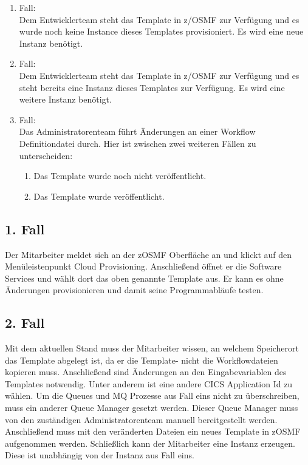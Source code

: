 \begin{samepage}
\begin{enumerate}
\item Fall:\\
Dem Entwicklerteam steht das Template in z/OSMF zur Verfügung und es wurde noch keine Instance dieses Templates provisioniert.
Es wird eine neue Instanz benötigt.
\item Fall:\\
Dem Entwicklerteam steht das Template in z/OSMF zur Verfügung und es steht bereits eine Instanz dieses Templates zur Verfügung.
Es wird eine weitere Instanz benötigt.
\item Fall:\\
Das Administratorenteam führt Änderungen an einer Workflow Definitiondatei durch.
Hier ist zwischen zwei weiteren Fällen zu unterscheiden:
\begin{enumerate}
\item Das Template wurde noch nicht veröffentlicht.
\item Das Template wurde veröffentlicht.
\end{enumerate}
\end{enumerate}
\end{samepage}

\subsection{1. Fall}
Der Mitarbeiter meldet sich an der zOSMF Oberfläche an und klickt auf den Menüleistenpunkt \glqq Cloud Provisioning\grqq.
Anschließend öffnet er die \glqq Software Services\grqq{} und wählt dort das oben genannte Template aus.
Er kann es ohne Änderungen provisionieren und damit seine Programmabläufe testen.

\subsection{2. Fall}
Mit dem aktuellen Stand muss der Mitarbeiter wissen, an welchem Speicherort das Template abgelegt ist, da er die Template- nicht die Workflowdateien kopieren muss.
Anschließend sind Änderungen an den Eingabevariablen des Templates notwendig.
Unter anderem ist eine andere CICS Application Id zu wählen.
Um die Queues und MQ Prozesse aus Fall eins nicht zu überschreiben, muss  ein anderer Queue Manager gesetzt werden.
Dieser Queue Manager muss von den zuständigen Administratorenteam manuell bereitgestellt werden.
Anschließend muss mit den veränderten Dateien ein neues Template in zOSMF aufgenommen werden.
Schließlich kann der Mitarbeiter eine Instanz erzeugen.
Diese ist unabhängig von der Instanz aus Fall eins.

